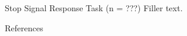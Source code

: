 \documentclass[final]{beamer}
\newlength{\sepwidth}
\newlength{\colwidth}
\newcommand{\separatorcolumn}{\begin{column}{\sepwidth}\end{column}}
\begin{document}
\begin{frame}[t]
\begin{columns}[t]
\begin{column}{\colwidth}
\begin{block}{Stop Signal Response Task (n = ???)}
    Filler text.
    
  \end{block}
  
  \begin{block}{References}
    \nocite{*}
    \renewcommand{\bibfont}{\fontsize{8}{10}\selectfont}
    \printbibliography[heading=none]
  \end{block}
\end{column}

\separatorcolumn
\end{columns}
\end{frame}
\end{document}
